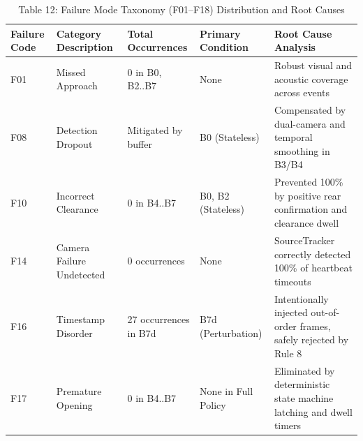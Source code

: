 \begin{table}[t]
\centering
\caption{Table 12: Failure Mode Taxonomy (F01–F18) Distribution and Root Causes}
\label{tab:table12_failure_analysis_taxonomy}
\begin{tabular}{lllll}
\hline
Failure Code & Category Description & Total Occurrences & Primary Condition & Root Cause Analysis \\
\hline
F01 & Missed Approach & 0 in B0, B2..B7 & None & Robust visual and acoustic coverage across events \\
F08 & Detection Dropout & Mitigated by buffer & B0 (Stateless) & Compensated by dual-camera and temporal smoothing in B3/B4 \\
F10 & Incorrect Clearance & 0 in B4..B7 & B0, B2 (Stateless) & Prevented 100\% by positive rear confirmation and clearance dwell \\
F14 & Camera Failure Undetected & 0 occurrences & None & SourceTracker correctly detected 100\% of heartbeat timeouts \\
F16 & Timestamp Disorder & 27 occurrences in B7d & B7d (Perturbation) & Intentionally injected out-of-order frames, safely rejected by Rule 8 \\
F17 & Premature Opening & 0 in B4..B7 & None in Full Policy & Eliminated by deterministic state machine latching and dwell timers \\
\hline
\end{tabular}
\end{table}
